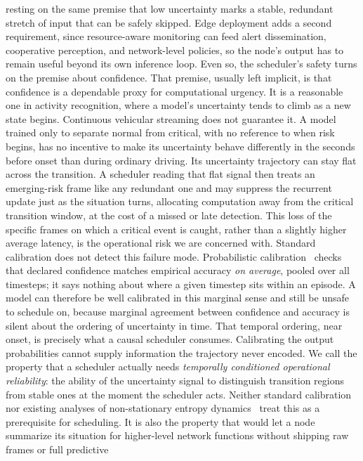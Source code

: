 \documentclass[a4paper,fleqn]{cas-dc}
\begin{document}
resting on the same premise that low uncertainty marks a stable, redundant stretch
of input that can be safely skipped. Edge deployment adds a second requirement,
since resource-aware monitoring can feed alert dissemination, cooperative
perception, and network-level policies, so the node's output has to remain useful
beyond its own inference loop. Even so, the scheduler's safety turns on the
premise about confidence.
That premise, usually left implicit, is that confidence is a dependable proxy for
computational urgency. It is a reasonable one in activity recognition, where a
model's uncertainty tends to climb as a new state begins. Continuous vehicular
streaming does not guarantee it. A model trained only to separate normal from
critical, with no reference to when risk begins, has no incentive to make its
uncertainty behave differently in the seconds before onset than during ordinary
driving. Its uncertainty trajectory can stay flat across the transition. A scheduler
reading that flat signal then treats an emerging-risk frame like any redundant one
and may suppress the recurrent update just as the situation turns, allocating computation away from the critical transition window, at the cost of a missed or late detection. This loss of the specific frames on which
a critical event is caught, rather than a slightly higher average latency, is the
operational risk we are concerned with.
Standard calibration does not detect this failure mode. Probabilistic
calibration~\cite{guo2017calibration} checks that declared confidence matches
empirical accuracy \emph{on average}, pooled over all timesteps; it says nothing
about where a given timestep sits within an episode. A model can therefore be
well calibrated in this marginal sense and still be unsafe to schedule on, because
marginal agreement between confidence and accuracy is silent about the ordering of
uncertainty in time. That temporal ordering, near onset, is precisely what a
causal scheduler consumes. Calibrating the output probabilities cannot supply
information the trajectory never encoded.
We call the property that a scheduler actually needs \emph{temporally conditioned
operational reliability}: the ability of the uncertainty signal to distinguish
transition regions from stable ones at the moment the scheduler acts. Neither
standard calibration nor existing analyses of non-stationary entropy
dynamics~\cite{braverman2020calib,dera2023trust} treat this as a prerequisite for
scheduling. It is also the property that would let a node summarize its situation
for higher-level network functions without shipping raw frames or full predictive
\end{document}
